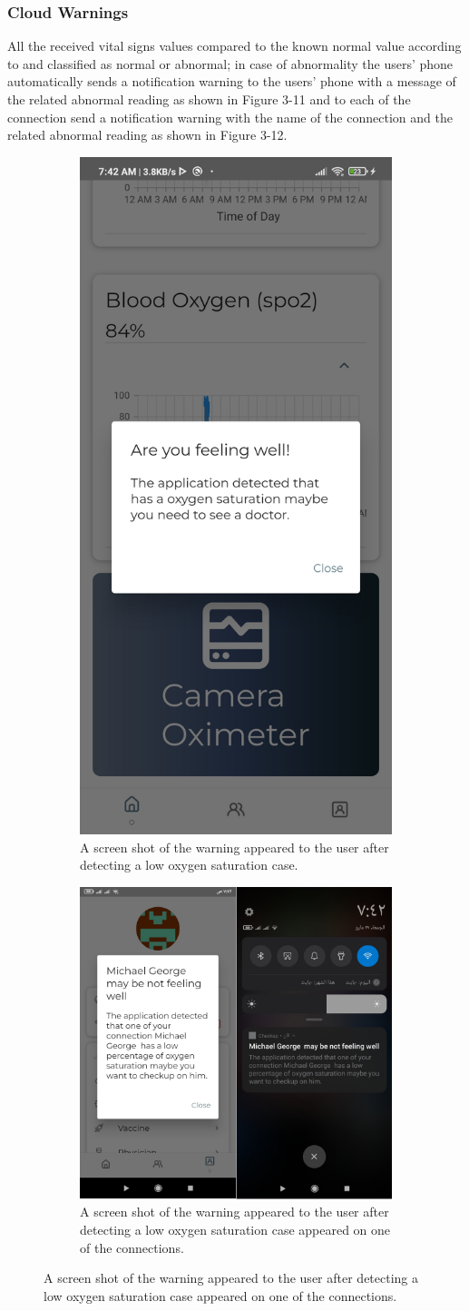 \documentclass{bmcart}
\begin{document}
\subsubsection*{Cloud Warnings}
All the received vital signs values compared to the known normal value according
to \cite{pulse} and classified as normal or abnormal; in case of abnormality the users’
phone automatically sends a notification warning to the users’ phone with a
message of the related abnormal reading as shown in Figure 3-11 and to each of
the connection send a notification warning with the name of the connection and
the related abnormal reading as shown in Figure 3-12.
\begin{figure}[h!]
  \begin{subfigure}{0.45\textwidth}
  \includegraphics[width=.3\linewidth]{jpg_images/user_warning.jpg}
  \caption{
      A screen shot of the warning appeared to the user after detecting a low
      oxygen saturation case.}
    \end{subfigure}
    \begin{subfigure}{0.45\textwidth}
    \includegraphics[width=.7\linewidth]{png_images/connection_warnning.png}
  \caption{
  A screen shot of the warning appeared to the user after detecting a low
  oxygen saturation case appeared on one of the connections.}
    \end{subfigure}

    \end{figure}
\FloatBarrier
\end{document}

